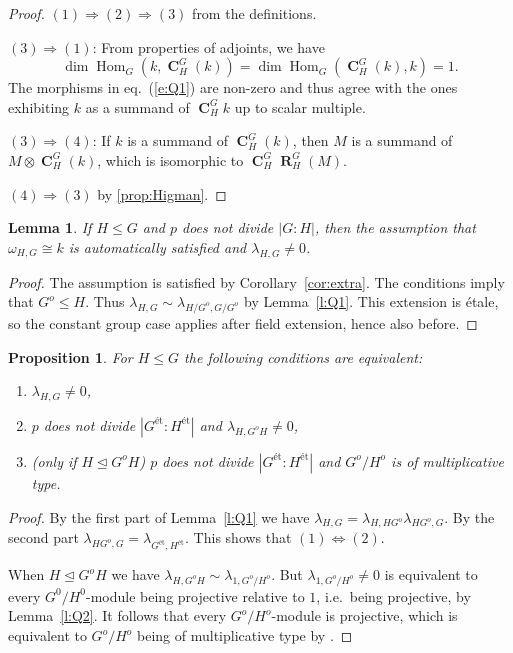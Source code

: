 \documentclass[12pt]{amsart}
\newtheorem{lemma}[theorem]{Lemma}
\newtheorem{proposition}[theorem]{Proposition}
\theoremstyle{definition}
\DeclareMathOperator{\coind}{\mathbf{C}}
\DeclareMathOperator{\res}{\mathbf{R}}
\DeclareMathOperator{\Hom}{Hom}
\begin{document}
	\begin{proof}
	$(1) \Rightarrow (2) \Rightarrow (3)$ from the definitions.
	
	$(3) \Rightarrow (1)$: From properties of adjoints, we have $$\dim \Hom_G(k,\coind^G_H(k)) = \dim \Hom_G(\coind^G_H(k),k)=1.$$ The morphisms in eq.\ (\ref{e:Q1}) are non-zero and thus agree with the ones exhibiting $k$ as a summand of $\coind^G_Hk$ up to scalar multiple.
	
	$(3) \Rightarrow (4)$: If $k$ is a summand of $\coind^G_H(k)$, then $M$ is a summand of $M \otimes \coind^G_H (k)$, which is isomorphic to $\coind^G_H \res^G_H (M)$.
	
	$(4) \Rightarrow (3)$ by \ref{prop:Higman}.
	\end{proof}
	
	\begin{lemma} \label{lem:coprime}
	If $H \leq G$ and $p$ does not divide $|G{:}H|$, then the assumption that $\omega_{H,G} \cong k$ is automatically satisfied and $\lambda_{H,G} \ne 0$.
	\end{lemma}
		
		\begin{proof}
		The assumption is satisfied by Corollary~\ref{cor:extra}. The conditions imply that $G^o \leq H$. Thus $\lambda_{H,G} \sim \lambda_{H/G^o,G/G^o}$ by Lemma~\ref{l:Q1}. This extension is \'etale, so the constant group case applies after field extension, hence also before.
	\end{proof}
	
	\begin{proposition}
		For $H \leq G$ the following conditions are equivalent:
		\begin{enumerate}
			\item $ \lambda_{H,G} \ne 0$,
			\item $p$ does not divide $|G^{\text{\'et}}{:}H^{\text{\'et}}|$ and $\lambda_{H,G^oH} \ne 0$,
		\item (only if $H \unlhd G^oH$) $p$ does not divide $|G^{\text{\'et}}{:}H^{\text{\'et}}|$ and $G^o/H^o$ is of multiplicative type.
		\end{enumerate}
		\end{proposition}
		
		\begin{proof}
			By the first part of Lemma~\ref{l:Q1} we  have $\lambda_{H,G} = \lambda_{H,HG^o} \lambda_{HG^o,G}$. By the second part $\lambda_{HG^o,G}=\lambda_{G^{\text{\'et}},H^{\text{\'et}}}$. This shows that $(1) \Leftrightarrow (2)$. 
			
			When $H \unlhd G^oH$ we have $\lambda_{H,G^oH} \sim \lambda_{1,G^o/H^o}$. But $\lambda_{1,G^o/H^o} \ne 0$ is equivalent to every $G^0/H^0$-module being projective relative to $1$, i.e.\ being projective, by Lemma~\ref{l:Q2}. It follows that every $G^o/H^o$-module is projective, which is equivalent to $G^o/H^o$ being of multiplicative type by \cite{MR1100646}.
		\end{proof}
		
\end{document}
